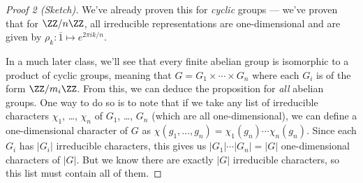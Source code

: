 \begin{proof}[Proof 2 (Sketch)]
We've already proven this for \emph{cyclic} groups --- we've proven that for $\ZZ/n\ZZ$, all irreducible representations are one-dimensional and are given by $\rho_k : \overline{1} \mapsto e^{2\pi i k/n}$. 

In a much later class, we'll see that every finite abelian group is isomorphic to a product of cyclic groups, meaning that $G = G_1 \times \cdots \times G_n$ where each $G_i$ is of the form $\ZZ/m_i\ZZ$. From this, we can deduce the proposition for \emph{all} abelian groups. One way to do so is to note that if we take any list of irreducible characters $\chi_1$, \ldots, $\chi_n$ of $G_1$, \ldots, $G_n$ (which are all one-dimensional), we can define a one-dimensional character of $G$ as $\chi(g_1, \ldots, g_n) = \chi_1(g_n)\cdots \chi_n(g_n)$. Since each $G_i$ has $|G_i|$ irreducible characters, this gives us $|G_1|\cdots |G_n| = |G|$ one-dimensional characters of $|G|$. But we know there are exactly $|G|$ irreducible characters, so this list must contain all of them. 
\end{proof}

